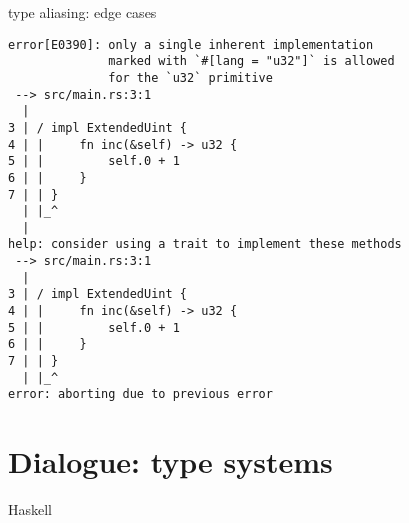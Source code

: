 \documentclass{beamer}
\begin{document}
\begin{frame}[fragile]{type aliasing: edge cases}
  \begin{verbatim}
error[E0390]: only a single inherent implementation
              marked with `#[lang = "u32"]` is allowed
              for the `u32` primitive
 --> src/main.rs:3:1
  |
3 | / impl ExtendedUint {
4 | |     fn inc(&self) -> u32 {
5 | |         self.0 + 1
6 | |     }
7 | | }
  | |_^
  |
help: consider using a trait to implement these methods
 --> src/main.rs:3:1
  |
3 | / impl ExtendedUint {
4 | |     fn inc(&self) -> u32 {
5 | |         self.0 + 1
6 | |     }
7 | | }
  | |_^
error: aborting due to previous error
  \end{verbatim}
\end{frame}

\begin{comment}
\section{Dialogue: Referential transparency}


* rust violates referential transparency: sometimes assignment makes the program compile::

    // replace s with its definition ⇒ crashes
    // this ⇒ compiles.

    #![allow(unused)]
    fn main() {
    let s = String::from(" Mary   had\ta\u{2009}little  \n\t lamb");
    let mut iter = s.split_whitespace();
    assert_eq!(Some("Mary"), iter.next());
    assert_eq!(Some("had"), iter.next());
    assert_eq!(Some("a"), iter.next());
    assert_eq!(Some("little"), iter.next());
    assert_eq!(Some("lamb"), iter.next());

    assert_eq!(None, iter.next());
    }
\end{comment}

\section{Dialogue: type systems}


\begin{frame}[standout]
  Haskell
\end{frame}
\end{document}
